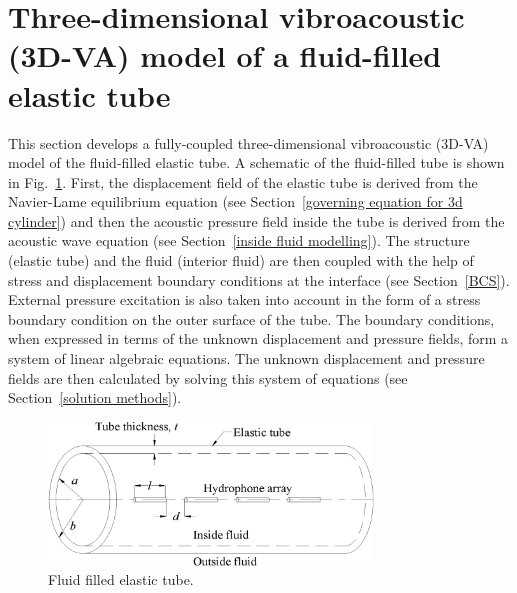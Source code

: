 \documentclass[11pt,cleanfoot]{asme2ej}
\begin{document}

\section{Three-dimensional vibroacoustic (3D-VA) model of a fluid-filled elastic tube} \label{sec:vamodel}
This section develops a fully-coupled three-dimensional vibroacoustic (3D-VA) model of the fluid-filled elastic tube. A schematic of the fluid-filled tube is shown in Fig.~\ref{fig:fluid filled elastic tube}. First, the displacement field of the elastic tube is derived from the Navier-Lame equilibrium equation (see Section~\ref{governing equation for 3d cylinder}) and then the acoustic pressure field inside the tube is derived from the acoustic wave equation (see Section~\ref{inside fluid modelling}). The structure (elastic tube) and the fluid (interior fluid) are then coupled with the help of stress and displacement boundary conditions at the interface (see Section~\ref{BCS}). External pressure excitation is also taken into account in the form of a stress boundary condition on the outer surface of the tube. The boundary conditions, when expressed in terms of the unknown displacement and pressure fields, form a system of linear algebraic equations. The unknown displacement and pressure fields are then calculated by solving this system of equations (see Section~\ref{solution methods}).

\begin{figure}
    \centering
    \includegraphics[width=3.4in]{Sonar_array_element.eps}
     \caption{Fluid filled elastic tube.}
    \label{fig:fluid filled elastic tube}
\end{figure}

\end{document}
